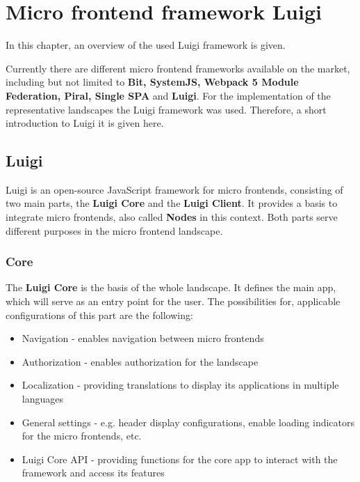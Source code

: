 \chapter{Micro frontend framework Luigi} %
\label{Chapter2}


In this chapter, an overview of the used Luigi framework is given.

Currently there are different micro frontend frameworks available on the market, including but not limited to \textbf{Bit, SystemJS, Webpack 5 Module Federation, Piral, Single SPA} and \textbf{Luigi}.\cite{top10_mffs}
For the implementation of the representative landscapes the Luigi framework was used. Therefore, a short introduction to Luigi it is given here.

\section{Luigi}

Luigi is an open-source JavaScript framework for micro frontends, consisting of two main parts, the \textbf{Luigi Core} and the \textbf{Luigi Client}. It provides a basis to integrate micro frontends, also called \textbf{Nodes} in this context. Both parts serve different purposes in the micro frontend landscape.\cite{luigi_doc_overview}

\subsection{Core}

The \textbf{Luigi Core} is the basis of the whole landscape. It defines the main app, which will serve as an entry point for the user. The possibilities for, applicable configurations of this part are the following:

\begin{itemize}[noitemsep]
	\item Navigation - enables navigation between micro frontends
	\item Authorization - enables authorization for the landscape
	\item Localization - providing translations to display its applications in multiple languages
	\item General settings - e.g. header display configurations, enable loading indicators for the micro frontends, etc.
	\item Luigi Core API - providing functions for the core app to interact with the framework and access its features
\end{itemize} 

